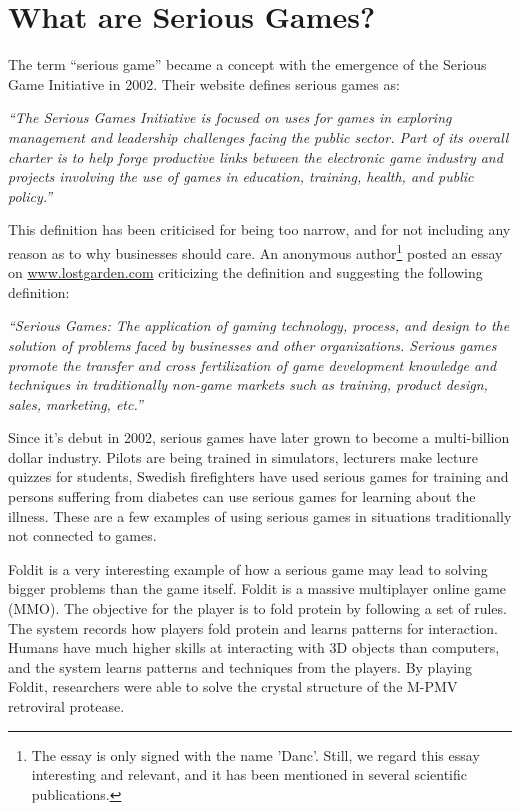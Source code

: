 \section{What are Serious Games?}
\label{sec:seriousgames}

The term ``serious game'' became a concept with the emergence of the Serious Game Initiative in 2002. Their website defines serious games as: 

\textit{``The Serious Games Initiative is focused on uses for games in exploring management and leadership challenges facing the public sector. Part of its overall charter is to help forge productive links between the electronic game industry and projects involving the use of games in education, training, health, and public policy.''}\cite{seriousgamesinitative}

This definition has been criticised for being too narrow, and for not including any reason as to why businesses should care. An anonymous author\footnote{The essay is only signed with the name 'Danc'. Still, we regard this essay interesting and relevant, and it has been mentioned in several scientific publications.} posted an essay on \url{www.lostgarden.com} criticizing the definition and suggesting the following definition:

\textit{``Serious Games: The application of gaming technology, process, and design to the solution of problems faced by businesses and other organizations. Serious games promote the transfer and cross fertilization of game development knowledge and techniques in traditionally non-game markets such as training, product design, sales, marketing, etc.''}


Since it's debut in 2002, serious games have later grown to become a multi-billion dollar industry.
Pilots are being trained in simulators, lecturers make lecture quizzes for students\cite{wang2007lecture}, Swedish firefighters have used serious games for training\cite{lebram2009design} and persons suffering from diabetes can use serious games for learning about the illness. These are a few examples of using serious games in situations traditionally not connected to games. 

Foldit is a very interesting example of how a serious game may lead to solving bigger problems than the game itself\cite{cooper2010predicting}. Foldit is a massive multiplayer online game (MMO). The objective for the player is to fold protein by following a set of rules. The system records how players fold protein and learns patterns for interaction. Humans have much higher skills at interacting with 3D objects than computers, and the system learns patterns and techniques from the players. By playing Foldit, researchers were able to solve the crystal structure of the M-PMV retroviral protease\cite{khatib2011crystal}.

